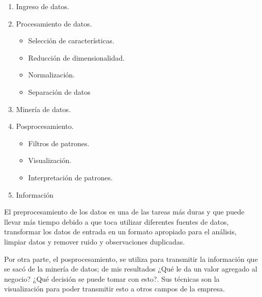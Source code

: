 \documentclass{article}
\begin{document}
\begin{enumerate}
  \item Ingreso de datos.
  \item Procesamiento de datos.
        \begin{itemize}
          \item Selección de características.
          \item Reducción de dimensionalidad.
          \item Normalización.
          \item Separación de datos
        \end{itemize}
  \item Minería de datos.
  \item Posprocesamiento.
        \begin{itemize}
          \item Filtros de patrones.
          \item Visualización.
          \item Interpretación de patrones.
        \end{itemize}
  \item Información
\end{enumerate}

El preprocesamiento de los datos es una de las tareas más duras y que puede llevar más tiempo debido a que toca utilizar diferentes fuentes de datos, transformar los datos de entrada en un formato apropiado para el análisis, limpiar datos y remover ruido y observaciones duplicadas.

Por otra parte, el posprocesamiento, se utiliza para transmitir la información que se sacó de la minería de datos; de mis resultados ¿Qué le da un valor agregado al negocio? ¿Qué decisión se puede tomar con esto?. Sus técnicas son la visualización para poder transmitir esto a otros campos de la empresa.
\end{document}
